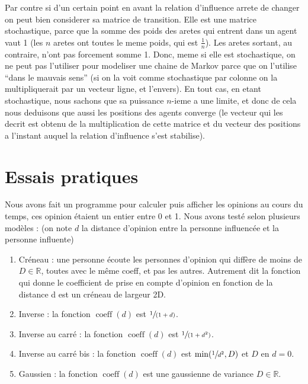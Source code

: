 \documentclass[a4paper,10pt]{report}
\begin{document}
Par contre si d'un certain point en avant la relation d'influence arrete de changer on peut bien considerer sa matrice de transition. Elle est une matrice stochastique, parce que la somme des poids des aretes qui entrent dans un agent vaut 1 (les $n$ aretes ont toutes le meme poids, qui est $\frac{1}{n}$). Les aretes sortant, au contraire, n'ont pas forcement somme 1. Donc, meme si elle est stochastique, on ne peut pas l'utiliser pour modeliser une chaine de Markov parce que on l'utilise ``dans le mauvais sens'' (si on la voit comme stochastique par colonne on la multipliquerait par un vecteur ligne, et l'envers). En tout cas, en etant stochastique, nous sachons que sa puissance $n$-ieme a une limite, et donc de cela nous deduisons que aussi les positions des agents converge (le vecteur qui les decrit est obtenu de la multiplication de cette matrice et du vecteur des positions a l'instant auquel la relation d'influence s'est stabilise).

\section{Essais pratiques}

Nous avons fait un programme pour calculer puis afficher les opinions au cours du temps, ces opinion étaient un entier entre 0 et 1. Nous avons testé selon plusieurs modèles : (on note $d$ la distance d'opinion entre la personne influencée et la personne influente)
\begin{enumerate}
\item Créneau : une personne écoute les personnes d'opinion qui diffère de moins de $D \in \mathbb{R}$, toutes avec le même coeff, et pas les autres. Autrement dit la fonction qui donne le coefficient de prise en compte d'opinion en fonction de la distance d est un créneau de largeur 2D.

\item Inverse : la fonction $\operatorname{coeff}(d)$ est $\sfrac{1}{(1+d)}$.

\item Inverse au carré : la fonction $\operatorname{coeff}(d)$ est $\sfrac{1}{(1+d^2)}$.

\item Inverse au carré bis : la fonction $\operatorname{coeff}(d)$ est $\min(\sfrac{1}{d^2}, D)$ et $D$ en $d=0$.

\item Gaussien : la fonction $\operatorname{coeff}(d)$ est une gaussienne de variance $D \in \mathbb{R}$.
\end{enumerate}
\end{document}
